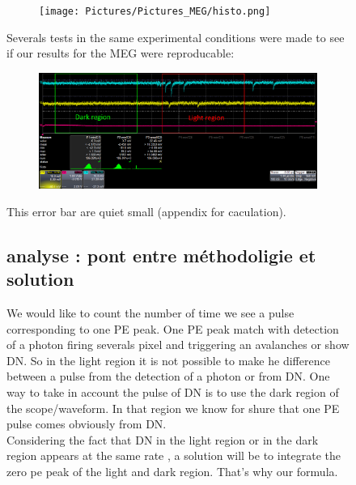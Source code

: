 \documentclass[a4paper, 11pt]{report}%
\begin{document}
\begin{figure}[!hbtp]
  \begin{figure}[!hbtp]
  \centering
  \texttt{[image: Pictures/Pictures\_MEG/histo.png]}
  \label{fig:histo}
  \end{figure}
  
  Severals tests in the same experimental conditions were made to see if our results for the MEG were reproducable:
  
  \begin{figure}[!hbtp]
  \centering
  \includegraphics[totalheight=0.22\textwidth,trim=0cm 6.5cm 0cm 0cm, clip=true]{Pictures/blabla/light_region_3.png}
  \label{fig:dark_light_region}
  \end{figure}
  
  This error bar are quiet small (appendix for caculation). 
  
  \subsection{analyse : pont entre méthodoligie et solution }
  
  We would like to count the number of time we see a pulse corresponding to one PE peak. One PE peak match with detection of a photon firing 
  severals pixel and triggering an avalanches or show  DN. So in the light region it is not possible to make he difference between a pulse 
  from the detection of a photon or from DN. One way to take in account the pulse of DN is to use the dark region of the scope/waveform. 
  In that region we know for shure that one PE pulse comes obviously from DN.\\
  Considering the fact that DN in the light region or in the dark region appears at the same rate , a solution will be to integrate the zero pe peak of the light and dark region. That's why our formula.
  

\end{figure}
\end{document}
